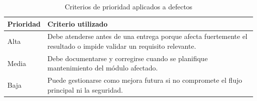 \documentclass[11pt,spanish]{article}
\begin{document}
\begin{table}[H]
\centering
\caption{Criterios de prioridad aplicados a defectos}
\label{tab:anexo-prioridad}
\begin{tabularx}{\textwidth}{p{3cm} Y}
\toprule
\textbf{Prioridad} & \textbf{Criterio utilizado} \\
\midrule
Alta & Debe atenderse antes de una entrega porque afecta fuertemente el resultado o impide validar un requisito relevante. \\
Media & Debe documentarse y corregirse cuando se planifique mantenimiento del módulo afectado. \\
Baja & Puede gestionarse como mejora futura si no compromete el flujo principal ni la seguridad. \\
\bottomrule
\end{tabularx}
\end{table}
\end{document}
